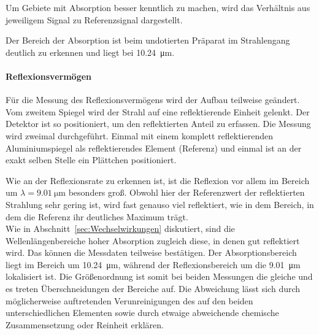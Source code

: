 \documentclass[a4paper,twoside,final]{article}
\begin{document}


Um Gebiete mit Absorption besser kenntlich zu machen, wird das Verhältnis aus jeweiligem Signal zu Referenzsignal dargestellt.


\FloatBarrier
Der Bereich der Absorption ist beim undotierten Präparat im Strahlengang deutlich zu erkennen und liegt bei \SI{10.24}{\micro\meter}.

\paragraph{Reflexionsvermögen}
Für die Messung des Reflexionsvermögens wird der Aufbau teilweise geändert. Vom zweitem Spiegel wird der Strahl auf eine reflektierende Einheit gelenkt. Der Detektor ist so positioniert, um den reflektierten Anteil zu erfassen. Die Messung wird zweimal durchgeführt. Einmal mit einem komplett reflektierenden Aluminiumspiegel als reflektierendes Element (Referenz) und einmal ist an der exakt selben Stelle ein  Plättchen positioniert.



\FloatBarrier
Wie an der Reflexionsrate zu erkennen ist, ist die Reflexion vor allem im Bereich um $\lambda = \SI{9.01}{\micro\meter}$ besonders groß. Obwohl hier der Referenzwert der reflektierten Strahlung sehr gering ist, wird fast genauso viel reflektiert, wie in dem Bereich, in dem die Referenz ihr deutliches Maximum trägt.\\

Wie in Abschnitt~\ref{sec:Wechselwirkungen} diskutiert, sind die Wellenlängenbereiche hoher Absorption zugleich diese, in denen gut reflektiert wird. Das können die Messdaten teilweise bestätigen. Der Absorptionsbereich liegt im Bereich um \SI{10.24}{\micro\meter}, während der Reflexionsbereich um die \SI{9.01}{\micro\meter} lokalisiert ist. Die Größenordnung ist somit bei beiden Messungen die gleiche und es treten Überschneidungen der Bereiche auf. Die Abweichung lässt sich durch möglicherweise auftretenden Verunreinigungen des  auf den beiden unterschiedlichen Elementen sowie durch etwaige abweichende chemische Zusammensetzung oder Reinheit erklären.
\end{document}
